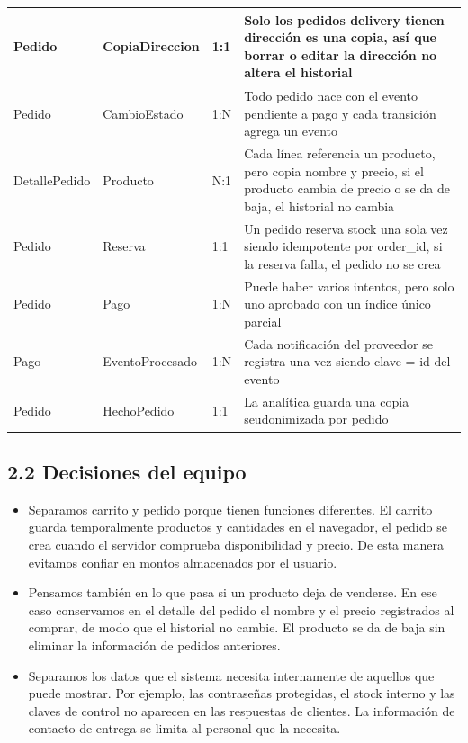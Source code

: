 \documentclass[10pt,letterpaper]{article}
\begin{document}
{\begin{longtable}{|P{\tabcolsep\relax}|P{\tabcolsep\relax}|P{\tabcolsep\relax}|P{\tabcolsep\relax}|}
Pedido & CopiaDireccion & 1:1 & Solo los pedidos delivery tienen dirección es una copia, así que borrar o editar la dirección no altera el historial \\ \hline
Pedido & CambioEstado & 1:N & Todo pedido nace con el evento pendiente a pago y cada transición agrega un evento \\ \hline
DetallePedido & Producto & N:1 & Cada línea referencia un producto, pero copia nombre y precio, si el producto cambia de precio o se da de baja, el historial no cambia \\ \hline
Pedido & Reserva & 1:1 & Un pedido reserva stock una sola vez siendo idempotente por order\_\allowbreak{}id, si la reserva falla, el pedido no se crea \\ \hline
Pedido & Pago & 1:N & Puede haber varios intentos, pero solo uno aprobado con un índice único parcial \\ \hline
Pago & EventoProcesado & 1:N & Cada notificación del proveedor se registra una vez siendo clave = id del evento \\ \hline
Pedido & HechoPedido & 1:1 & La analítica guarda una copia seudonimizada por pedido  \\ \hline
\end{longtable}}

\subsection*{2.2 Decisiones del equipo}
\begin{itemize}
\item Separamos carrito y pedido porque tienen funciones diferentes. El carrito guarda temporalmente productos y cantidades en el navegador, el pedido se crea cuando el servidor comprueba disponibilidad y precio. De esta manera evitamos confiar en montos almacenados por el usuario.
\item Pensamos también en lo que pasa si un producto deja de venderse. En ese caso conservamos en el detalle del pedido el nombre y el precio registrados al comprar, de modo que el historial no cambie. El producto se da de baja sin eliminar la información de pedidos anteriores.
\item Separamos los datos que el sistema necesita internamente de aquellos que puede mostrar. Por ejemplo, las contraseñas protegidas, el stock interno y las claves de control no aparecen en las respuestas de clientes. La información de contacto de entrega se limita al personal que la necesita.
\end{itemize}
\end{document}

